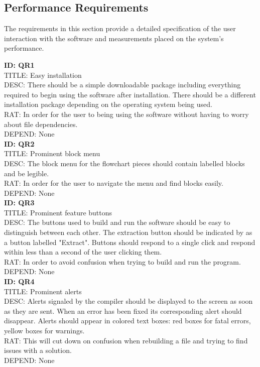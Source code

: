 \documentclass[journal,10pt,onecolumn,compsoc]{IEEEtran} \usepackage[margin=1.0in]{geometry} \usepackage{pdfpages} \usepackage{graphicx}
\begin{document}
\subsection{Performance Requirements}

The requirements in this section provide a detailed specification of the user interaction with the software and measurements placed on the system's performance.

\noindent
\textbf{ID: QR1}\\
TITLE: Easy installation\\
DESC: There should be a simple downloadable package including everything required to begin using the software after installation.
There should be a different installation package depending on the operating system being used.\\
RAT: In order for the user to being using the software without having to worry about file dependencies.\\
DEPEND: None\\

\noindent
\textbf{ID: QR2}\\
TITLE: Prominent block menu\\
DESC: The block menu for the flowchart pieces should contain labelled blocks and be legible.\\
RAT: In order for the user to navigate the menu and find blocks easily.\\
DEPEND: None\\

\noindent
\textbf{ID: QR3}\\
TITLE: Prominent feature buttons\\
DESC: The buttons used to build and run the software should be easy to distinguish between each other. 
The extraction button should be indicated by as a button labelled "Extract".
Buttons should respond to a single click and respond within less than a second of the user clicking them.\\
RAT: In order to avoid confusion when trying to build and run the program.\\
DEPEND: None\\

\noindent
\textbf{ID: QR4}\\
TITLE: Prominent alerts\\
DESC: Alerts signaled by the compiler should be displayed to the screen as soon as they are sent. 
When an error has been fixed its corresponding alert should disappear.
Alerts should appear in colored text boxes: red boxes for fatal errors, yellow boxes for warnings.\\
RAT: This will cut down on confusion when rebuilding a file and trying to find issues with a solution.\\
DEPEND: None\\
\end{document}
